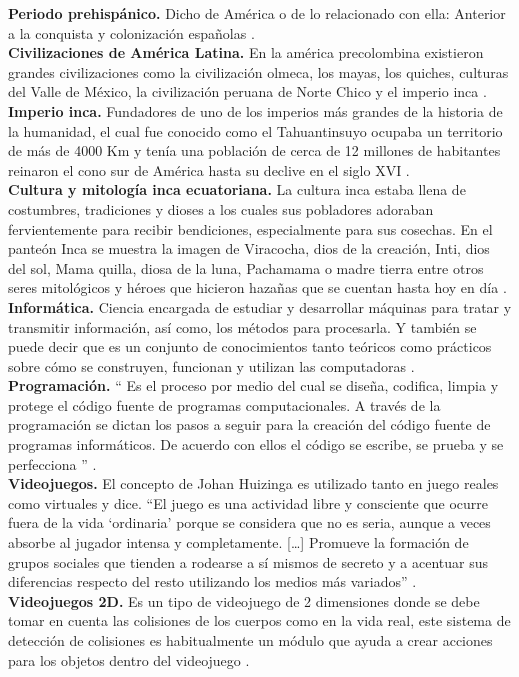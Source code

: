 \documentclass[a4paper, openright, 12pt]{report}
\begin{document}
\justify
\textbf{Periodo prehispánico.} Dicho de América o de lo relacionado con ella: Anterior a la conquista y colonización españolas \cite{Espanola2119}.\\
\textbf{Civilizaciones de América Latina.} En la américa precolombina existieron grandes civilizaciones como la civilización olmeca, los mayas, los quiches, culturas del Valle de México, la civilización peruana de Norte Chico y el imperio inca \cite{chang2007}.\\
\textbf{Imperio inca.} Fundadores de uno de los imperios más grandes de la historia de la humanidad, el cual fue conocido como el Tahuantinsuyo ocupaba un territorio de más de 4000 Km y tenía una población de cerca de 12 millones de habitantes reinaron el cono sur de América hasta su declive en el siglo XVI \cite{baudouin2012}.\\
\textbf{Cultura y mitología inca ecuatoriana.} La cultura inca estaba llena de costumbres, tradiciones y dioses a los cuales sus pobladores adoraban fervientemente para recibir bendiciones, especialmente para sus cosechas. En el panteón Inca se muestra la imagen de Viracocha, dios de la creación, Inti, dios del sol, Mama quilla, diosa de la luna, Pachamama o madre tierra entre otros seres mitológicos y héroes que hicieron hazañas que se cuentan hasta hoy en día \cite{steele2004}.\\
\textbf{Informática.} Ciencia encargada de estudiar y desarrollar máquinas para tratar y transmitir información, así como, los métodos para procesarla. Y también se puede decir que es un conjunto de conocimientos tanto teóricos como prácticos sobre cómo se construyen, funcionan y utilizan las computadoras \cite{de2004}.\\
\textbf{Programación.} “ Es el proceso por medio del cual se diseña, codifica, limpia y protege el código fuente de programas computacionales. A través de la programación se dictan los pasos a seguir para la creación del código fuente de programas informáticos. De acuerdo con ellos el código se escribe, se prueba y se perfecciona ” \cite{programacion2019}.\\
\textbf{Videojuegos.} El concepto de Johan Huizinga es utilizado tanto en juego reales como virtuales y dice. “El juego es una actividad libre y consciente que ocurre fuera de la vida ‘ordinaria’ porque se considera que no es seria, aunque a veces absorbe al jugador intensa y completamente. […] Promueve la formación de grupos sociales que tienden a rodearse a sí mismos de secreto y a acentuar sus diferencias respecto del resto utilizando los medios más variados” \cite{lacasa2011}. \\
\textbf{Videojuegos 2D.} Es un tipo de videojuego de 2 dimensiones donde se debe tomar en cuenta las colisiones de los cuerpos como en la vida real, este sistema de detección de colisiones es habitualmente un módulo que ayuda a crear acciones para los objetos dentro del videojuego \cite{moyadesarrollo}.
\end{document}
